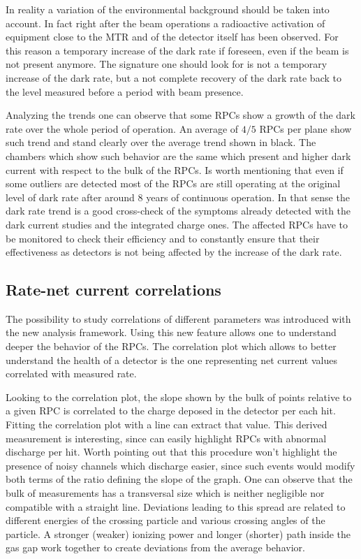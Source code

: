 In reality a variation of the environmental background should be taken into account.
In fact right after the beam operations a radioactive activation of equipment close to the MTR and of the detector itself has been observed.
For this reason a temporary increase of the dark rate if foreseen, even if the beam is not present anymore.
The signature one should look for is not a temporary increase of the dark rate, but a not complete recovery of the dark rate back to the level measured before a period with beam presence.

Analyzing the trends one can observe that some RPCs show a growth of the dark rate over the whole period of operation.
An average of $4/5$ RPCs per plane show such trend and stand clearly over the average trend shown in black.
The chambers which show such behavior are the same which present and higher dark current with respect to the bulk of the RPCs.
Is worth mentioning that even if some outliers are detected most of the RPCs are still operating at the original level of dark rate after around 8 years of continuous operation.
In that sense the dark rate trend is a good cross-check of the symptoms already detected with the dark current studies and the integrated charge ones.
The affected RPCs have to be monitored to check their efficiency and to constantly ensure that their effectiveness as detectors is not being affected by the increase of the dark rate.

\subsection{Rate-net current correlations}
The possibility to study correlations of different parameters was introduced with the new analysis framework.
Using this new feature allows one to understand deeper the behavior of the RPCs.
The correlation plot which allows to better understand the health of a detector is the one representing net current values correlated with measured rate.

Looking to the correlation plot, the slope shown by the bulk of points relative to a given RPC is correlated to the charge deposed in the detector per each hit.
Fitting the correlation plot with a line can extract that value.
This derived measurement is interesting, since can easily highlight RPCs with abnormal discharge per hit.
Worth pointing out that this procedure won't highlight the presence of noisy channels which discharge easier, since such events would modify both terms of the ratio defining the slope of the graph.
One can observe that the bulk of measurements has a transversal size which is neither negligible nor compatible with a straight line.
Deviations leading to this spread are related to different energies of the crossing particle and various crossing angles of the particle.
A stronger (weaker) ionizing power and longer (shorter) path inside the gas gap work together to create deviations from the average behavior.

